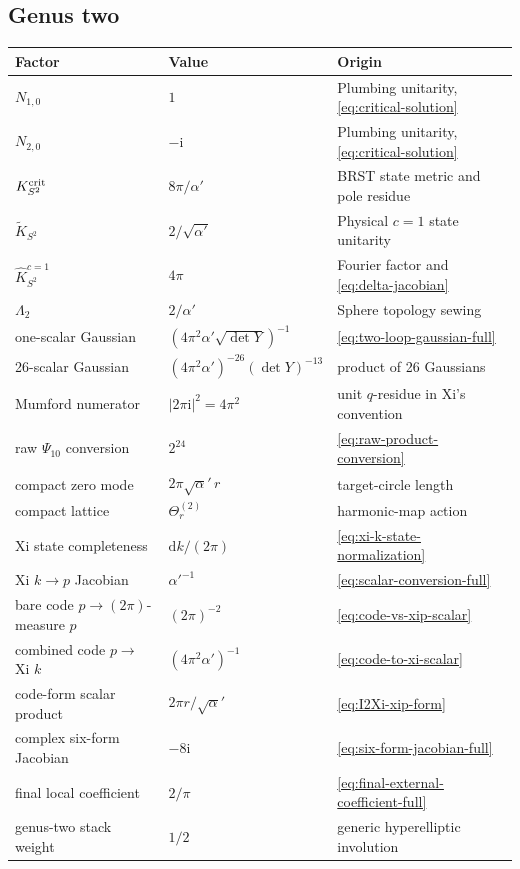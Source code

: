 \documentclass[11pt]{article}
\numberwithin{equation}{section}
\newcommand{\A}{\alpha'}
\newcommand{\dd}{\mathrm d}
\newcommand{\ii}{\mathrm i}
\newcommand{\wh}{\widehat}
\newcommand{\wt}{\widetilde}
\begin{document}
\subsection*{Genus two}
\begin{center}
\small
\begin{tabular}{@{}p{}p{}p{}@{}}
\toprule
Factor & Value & Origin \\
\midrule
$N_{1,0}$ & $1$ & Plumbing unitarity, \eqref{eq:critical-solution} \\
$N_{2,0}$ & $-\ii$ & Plumbing unitarity, \eqref{eq:critical-solution} \\
$K_{S^2}^{\rm crit}$ & $8\pi/\A$ & BRST state metric and pole residue \\
$\wt K_{S^2}$ & $2/\sqrt{\A}$ & Physical $c=1$ state unitarity \\
$\wh K_{S^2}^{c=1}$ & $4\pi$ & Fourier factor and \eqref{eq:delta-jacobian} \\
$\Lambda_2$ & $2/\A$ & Sphere topology sewing \\
one-scalar Gaussian & $(4\pi^2\A\sqrt{\det Y})^{-1}$ & \eqref{eq:two-loop-gaussian-full} \\
26-scalar Gaussian & $(4\pi^2\A)^{-26}(\det Y)^{-13}$ & product of 26 Gaussians \\
Mumford numerator & $|2\pi\ii|^2=4\pi^2$ & unit $q$-residue in Xi's convention \\
raw $\Psi_{10}$ conversion & $2^{24}$ & \eqref{eq:raw-product-conversion} \\
compact zero mode & $2\pi\sqrt\A\,r$ & target-circle length \\
compact lattice & $\Theta_r^{(2)}$ & harmonic-map action \\
Xi state completeness & $\dd k/(2\pi)$ & \eqref{eq:xi-k-state-normalization} \\
Xi $k\to p$ Jacobian & $\A^{-1}$ & \eqref{eq:scalar-conversion-full} \\
bare code $p\to(2\pi)$-measure $p$ & $(2\pi)^{-2}$ & \eqref{eq:code-vs-xip-scalar} \\
combined code $p\to$ Xi $k$ & $(4\pi^2\A)^{-1}$ & \eqref{eq:code-to-xi-scalar} \\
code-form scalar product & $2\pi r/\sqrt\A$ & \eqref{eq:I2Xi-xip-form} \\
complex six-form Jacobian & $-8\ii$ & \eqref{eq:six-form-jacobian-full} \\
final local coefficient & $2/\pi$ & \eqref{eq:final-external-coefficient-full} \\
genus-two stack weight & $1/2$ & generic hyperelliptic involution \\
\bottomrule
\end{tabular}
\end{center}
\end{document}
